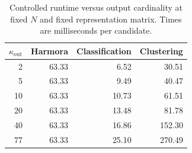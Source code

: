 \begin{table}[t]
\centering
\caption{Controlled runtime versus output cardinality at fixed $N$ and fixed representation matrix. Times are milliseconds per candidate.}
\label{tab:runtime_cardinality}
\scriptsize
\setlength{\tabcolsep}{4pt}
\begin{tabular}{rrrr}
\toprule
$\kappa_{\mathrm{out}}$ & \textbf{Harmora} & \textbf{Classification} & \textbf{Clustering} \\
\midrule
2 & 63.33 & 6.52 & 30.51 \\
5 & 63.33 & 9.49 & 40.47 \\
10 & 63.33 & 10.73 & 61.51 \\
20 & 63.33 & 13.48 & 81.78 \\
40 & 63.33 & 16.86 & 152.30 \\
77 & 63.33 & 25.10 & 270.49 \\
\bottomrule
\end{tabular}
\end{table}
